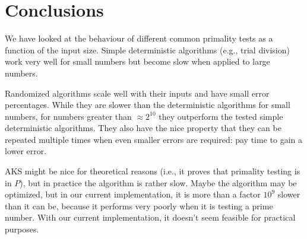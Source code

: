\section{Conclusions}


We have looked at the behaviour of different common primality tests as a function of the input size.
Simple deterministic algorithms (e.g., trial division) work very well for small numbers but become slow when applied to large numbers.

Randomized algorithms scale well with their inputs and have small error percentages.
While they are slower than the deterministic algorithms for small numbers,
for numbers greater than $\approx 2^{10}$ they outperform the tested simple deterministic algorithms.
They also have the nice property that they can be repeated multiple times when even smaller errors are required: pay time to gain a lower error.

AKS might be nice for theoretical reasons (i.e., it proves that primality testing is in $P$), but in practice the algorithm is rather slow.
Maybe the algorithm may be optimized, but in our current implementation, it is more than a factor $10^9$ slower than it can be,
because it performs very poorly when it is testing a prime number.
With our current implementation, it doesn't seem feasible for practical purposes.
